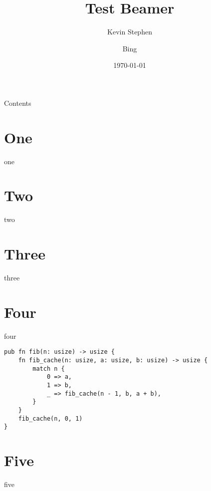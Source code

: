 \documentclass{ksbeamer}
\title{Test Beamer}
\author{Kevin Stephen \and Bing}
\date{\today}
\begin{document}
\frame{\titlepage}

\begin{frame}{Contents}
    \tableofcontents
\end{frame}

\section{One}

\begin{frame}{one}
    \lipsum[1][10]
\end{frame}

\section{Two}

\begin{frame}{two}
    \lipsum[1][10]
\end{frame}

\section{Three}

\begin{frame}{three}
    \lipsum[1][10]
\end{frame}

\section{Four}

\begin{frame}[fragile]{four}
    \begin{center}
        \begin{minipage}{0.8\textwidth}
            \begin{verbatim}
pub fn fib(n: usize) -> usize {
    fn fib_cache(n: usize, a: usize, b: usize) -> usize {
        match n {
            0 => a,
            1 => b,
            _ => fib_cache(n - 1, b, a + b),
        }
    }
    fib_cache(n, 0, 1)
}
            \end{verbatim}
        \end{minipage}
    \end{center}
\end{frame}

\section{Five}

\begin{frame}{five}
\end{frame}
\end{document}

